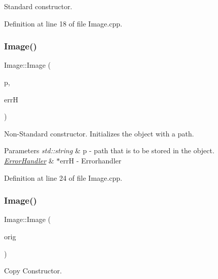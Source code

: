 Standard constructor. 



Definition at line 18 of file Image.\+cpp.

\mbox{\label{classImage_ae17a70dac9941346eab9e5abef1c03c7}} 
\subsubsection{\texorpdfstring{Image()}{Image()}\hspace{0.1cm}{\footnotesize\ttfamily [2/3]}}
{\footnotesize\ttfamily Image\+::\+Image (\begin{DoxyParamCaption}\item[{std\+::string}]{p,  }\item[{\mbox{\hyperlink{classErrorHandler}{Error\+Handler}} $\ast$}]{errH }\end{DoxyParamCaption})}



Non-\/\+Standard constructor. Initializes the object with a path. 


\begin{DoxyParams}{Parameters}
{\em std\+::string} & p -\/ path that is to be stored in the object. \\
\hline
{\em \mbox{\hyperlink{classErrorHandler}{Error\+Handler}}} & $\ast$errH -\/ Errorhandler \\
\hline
\end{DoxyParams}


Definition at line 24 of file Image.\+cpp.

\mbox{\label{classImage_abda271aa11b907dda8c8c8176684227d}} 
\subsubsection{\texorpdfstring{Image()}{Image()}\hspace{0.1cm}{\footnotesize\ttfamily [3/3]}}
{\footnotesize\ttfamily Image\+::\+Image (\begin{DoxyParamCaption}\item[{const \mbox{\hyperlink{classImage}{Image}} \&}]{orig }\end{DoxyParamCaption})}



Copy Constructor. 


